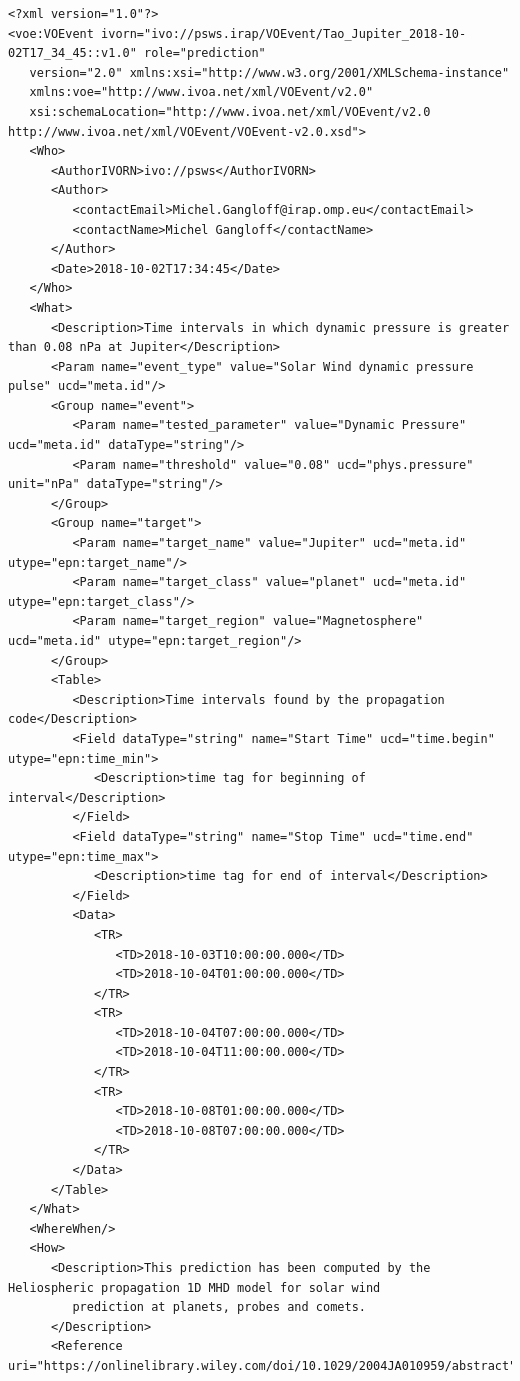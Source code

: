 \documentclass[referee,a4paper,12pt,traditabstract]{swsc}
\begin{document}
\begin{linenumbers}
{\tiny 
\begin{verbatim}
<?xml version="1.0"?>
<voe:VOEvent ivorn="ivo://psws.irap/VOEvent/Tao_Jupiter_2018-10-02T17_34_45::v1.0" role="prediction"
   version="2.0" xmlns:xsi="http://www.w3.org/2001/XMLSchema-instance"
   xmlns:voe="http://www.ivoa.net/xml/VOEvent/v2.0"
   xsi:schemaLocation="http://www.ivoa.net/xml/VOEvent/v2.0 http://www.ivoa.net/xml/VOEvent/VOEvent-v2.0.xsd">
   <Who>
      <AuthorIVORN>ivo://psws</AuthorIVORN>
      <Author>
         <contactEmail>Michel.Gangloff@irap.omp.eu</contactEmail>
         <contactName>Michel Gangloff</contactName>
      </Author>
      <Date>2018-10-02T17:34:45</Date>
   </Who>
   <What>
      <Description>Time intervals in which dynamic pressure is greater than 0.08 nPa at Jupiter</Description>
      <Param name="event_type" value="Solar Wind dynamic pressure pulse" ucd="meta.id"/>
      <Group name="event">
         <Param name="tested_parameter" value="Dynamic Pressure" ucd="meta.id" dataType="string"/>
         <Param name="threshold" value="0.08" ucd="phys.pressure" unit="nPa" dataType="string"/>
      </Group>
      <Group name="target">
         <Param name="target_name" value="Jupiter" ucd="meta.id" utype="epn:target_name"/>
         <Param name="target_class" value="planet" ucd="meta.id" utype="epn:target_class"/>
         <Param name="target_region" value="Magnetosphere" ucd="meta.id" utype="epn:target_region"/>
      </Group>
      <Table>
         <Description>Time intervals found by the propagation code</Description>
         <Field dataType="string" name="Start Time" ucd="time.begin" utype="epn:time_min">
            <Description>time tag for beginning of interval</Description>
         </Field>
         <Field dataType="string" name="Stop Time" ucd="time.end" utype="epn:time_max">
            <Description>time tag for end of interval</Description>
         </Field>
         <Data>
            <TR>
               <TD>2018-10-03T10:00:00.000</TD>
               <TD>2018-10-04T01:00:00.000</TD>
            </TR>
            <TR>
               <TD>2018-10-04T07:00:00.000</TD>
               <TD>2018-10-04T11:00:00.000</TD>
            </TR>
            <TR>
               <TD>2018-10-08T01:00:00.000</TD>
               <TD>2018-10-08T07:00:00.000</TD>
            </TR>
         </Data>
      </Table>
   </What>
   <WhereWhen/>
   <How>
      <Description>This prediction has been computed by the Heliospheric propagation 1D MHD model for solar wind 
         prediction at planets, probes and comets.
      </Description>
      <Reference uri="https://onlinelibrary.wiley.com/doi/10.1029/2004JA010959/abstract"/>

\end{verbatim}}
\end{linenumbers}
\end{document}
